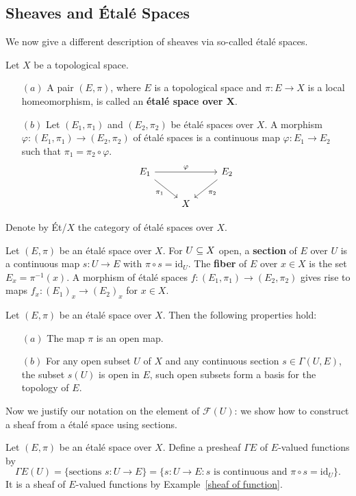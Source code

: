 \subsection{Sheaves and \'Etal\'e Spaces}
We now give a different description of sheaves via so-called \'etal\'e spaces.
\begin{definition}
Let $X$ be a topological space.
\begin{itemize}
\item[$(a)$] A pair $(E,\pi)$, where $E$ is a topological space and $\pi:E\to X$ is a local homeomorphism, is called an \textbf{\'etal\'e space over $\bm{X}$}.
\item[$(b)$] Let $(E_1,\pi_1)$ and $(E_2,\pi_2)$ be \'etal\'e spaces over $X$. A morphism $\varphi:(E_1,\pi_1)\to(E_2,\pi_2)$ of \'etal\'e spaces is a continuous map $\varphi:E_1\to E_2$ such that $\pi_1=\pi_2\circ\varphi$.
\[\begin{tikzcd}
E_1\ar[rr,"\varphi"]\ar[rd,swap,"\pi_1"]&&E_2\ar[ld,"\pi_2"]\\
&X&
\end{tikzcd}\]
\end{itemize}
Denote by \'Et/$X$ the category of \'etal\'e spaces over $X$.
\end{definition}
\begin{definition}
Let $(E,\pi)$ be an étalé space over $X$. For $U\subseteq X$ open, a \textbf{section} of $E$ over $U$ is a continuous map $s:U\to E$ with $\pi\circ s=\mathrm{id}_U$. The \textbf{fiber} of $E$ over $x\in X$ is the set $E_x=\pi^{-1}(x)$. A morphism of étalé spaces $f:(E_1,\pi_1)\to(E_2,\pi_2)$ gives rise to maps $f_x:(E_1)_x\to(E_2)_x$ for $x\in X$.
\end{definition}
\begin{proposition}
Let $(E,\pi)$ be an étalé space over $X$. Then the following properties hold:
\begin{itemize}
\item[$(a)$] The map $\pi$ is an open map.
\item[$(b)$] For any open subset $U$ of $X$ and any continuous section $s\in\Gamma(U,E)$, the subset $s(U)$ is open in $E$, such open subsets form a basis for the topology of $E$.
\end{itemize}
\end{proposition}
Now we justify our notation on the element of $\mathscr{F}(U)$: we show how to construct a sheaf from a \'etal\'e space using sections.
\begin{definition}
Let $(E,\pi)$ be an étalé space over $X$. Define a presheaf $\Gamma E$ of $E$-valued functions by
\[\Gamma E(U)=\{\text{sections }s:U\to E\}=\{s:U\to E:\text{$s$ is continuous and $\pi\circ s=\mathrm{id}_U$}\}.\]
It is a sheaf of $E$-valued functions by Example~\ref{sheaf of function}.
\end{definition}
